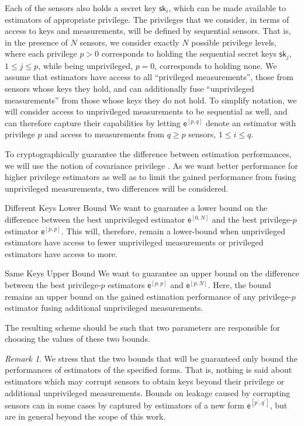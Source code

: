 \documentclass[conference]{IEEEtran}
\theoremstyle{definition}
\theoremstyle{remark}
\newtheorem*{remark}{Remark}
\begin{document}
Each of the sensors also holds a secret key $\mathsf{sk}_i$, which can be made available to estimators of appropriate privilege. The privileges that we consider, in terms of access to keys and measurements, will be defined by sequential sensors. That is, in the presence of $N$ sensors, we consider exactly $N$ possible privilege levels, where each privilege $p>0$ corresponds to holding the sequential secret keys $\mathsf{sk}_j$, $1\leq j \leq p$, while being unprivileged, $p=0$, corresponds to holding none. We assume that estimators have access to all ``privileged measurements'', those from sensors whose keys they hold, and can additionally fuse ``unprivileged measurements'' from those whose keys they do not hold. To simplify notation, we will consider access to unprivileged measurements to be sequential as well, and can therefore capture their capabilities by letting $\mathsf{e}^{[p,q]}$ denote an estimator with privilege $p$ and access to measurements from $q\geq p$ sensors, $1\leq i \leq q$.

To cryptographically guarantee the difference between estimation performances, we will use the notion of covariance privilege \cite{risticCryptographicallyPrivilegedState2022}. As we want better performance for higher privilege estimators as well as to limit the gained performance from fusing unprivileged measurements, two differences will be considered.
\begin{LaTeXdescription}
  \item[Different Keys Lower Bound] We want to guarantee a lower bound on the difference between the best unprivileged estimator $\mathsf{e}^{[0,N]}$ and the best privilege-$p$ estimator $\mathsf{e}^{[p,p]}$. This will, therefore, remain a lower-bound when unprivileged estimators have access to fewer unprivileged measurements or privileged estimators have access to more.
  \item[Same Keys Upper Bound] We want to guarantee an upper bound on the difference between the best privilege-$p$ estimators $\mathsf{e}^{[p,p]}$ and $\mathsf{e}^{[p,N]}$. Here, the bound remains an upper bound on the gained estimation performance of any privilege-$p$ estimator fusing additional unprivileged measurements.
\end{LaTeXdescription}
The resulting scheme should be such that two parameters are responsible for choosing the values of these two bounds.
\begin{remark}
  We stress that the two bounds that will be guaranteed only bound the performances of estimators of the specified forms. That is, nothing is said about estimators which may corrupt sensors to obtain keys beyond their privilege or additional unprivileged measurements. Bounds on leakage caused by corrupting sensors can in some cases by captured by estimators of a new form $\mathsf{e}^{[p^\prime,q^\prime]}$, but are in general beyond the scope of this work.
\end{remark}
\end{document}
